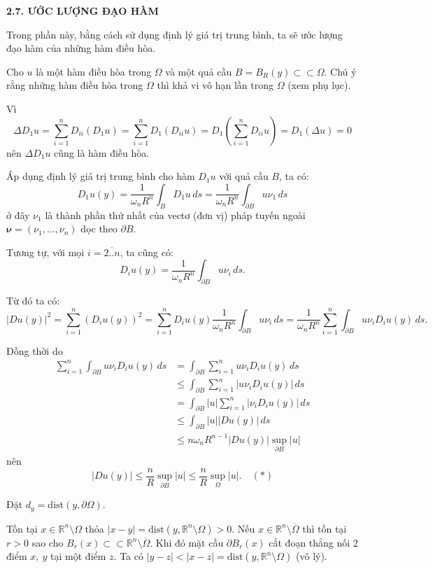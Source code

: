 \begin{center}
\textbf{2.7. ƯỚC LƯỢNG ĐẠO HÀM}
\end{center}

Trong phần này, bằng cách sử dụng định lý giá trị trung bình, ta sẽ ước lượng đạo hàm của những hàm điều hòa.

Cho $u$ là một hàm điều hòa trong $\Omega$ và một quả cầu $B=B_R(y)\subset\subset\Omega$. Chú ý rằng những hàm điều hòa trong $\Omega$ thì khả vi vô hạn lần trong $\Omega$ (xem phụ lục).

Vì 
\[\Delta D_1 u=\sum_{i=1}^{n}D_{ii}(D_1 u)= \sum_{i=1}^{n}D_1(D_{ii}u)=D_1(\sum_{i=1}^{n}D_{ii}u)=D_1(\Delta u)=0\]
nên $\Delta D_1 u $ cũng là hàm điều hòa.

Áp dụng định lý giá trị trung bình cho hàm $D_1 u$ với quả cầu $B$, ta có:
\[ D_1 u(y)=\frac{1}{\omega_n R^n}\int_{B}D_1 u \,ds=\frac{1}{\omega_n R^n}\int_{\partial B}u\nu_1 \,ds\]
ở đây $\nu_1$ là thành phần thứ nhất của vectơ (đơn vị) pháp tuyến ngoài $\boldsymbol{\nu}=(\nu_1,\ldots,\nu_n)$ dọc theo $\partial B$.

Tương tự, với mọi $i=\overline{2..n}$, ta cũng có:
\[ D_i u(y)=\frac{1}{\omega_n R^n}\int_{\partial B}u\nu_i \,ds.\]

Từ đó ta có:
\[ |Du(y)|^2=\sum_{i=1}^{n}(D_i u(y))^2=\sum_{i=1}^{n}D_i u(y)\frac{1}{\omega_n R^n}\int_{\partial B}u\nu_i \,ds = \frac{1}{\omega_n R^n}\sum_{i=1}^{n}\int_{\partial B}u\nu_i D_i u(y) \,ds.\]

Đồng thời do
\begin{align*}\sum_{i=1}^{n}\int_{\partial B}u\nu_i D_i u(y) \,ds &= \int_{\partial B}\sum_{i=1}^{n}u\nu_i D_i u(y) \,ds \\
&\leq 
\int_{\partial B}\sum_{i=1}^{n}|u\nu_i D_i u(y)| \,ds \\
&= \int_{\partial B}|u|\sum_{i=1}^{n}|\nu_i D_i u(y)| \,ds \\
&\leq \int_{\partial B}|u||Du(y)|\,ds  \\
&\leq n\omega_n R^{n-1}|Du(y)|\sup_{\partial B} |u|\end{align*}
nên \[|Du(y)|\leq \frac{n}{R}\sup\limits_{\partial B} |u|\leq \frac{n}{R}\sup\limits_{\Omega}|u|.\quad (*)\]

Đặt $d_y=\mbox{dist}(y,\partial\Omega)$.

Tồn tại $x\in \mathbb{R}^n \setminus \Omega$ thỏa $|x-y|=\mbox{dist}(y,\mathbb{R}^n \setminus \Omega)>0$. Nếu $x\in\mathbb{R}^n \setminus \overline{\Omega}$ thì tồn tại $r>0$ sao cho $B_r(x)\subset\subset\mathbb{R}^n \setminus \overline{\Omega}$. Khi đó mặt cầu $\partial B_r(x)$ cắt đoạn thẳng nối 2 điểm $x,\ y$ tại một điểm $z$. Ta có $|y-z|<|x-z|=\mbox{dist}(y,\mathbb{R}^n \setminus \Omega)$ (vô lý).

